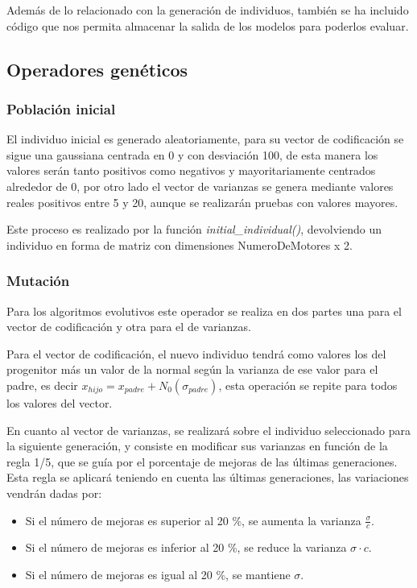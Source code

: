 \documentclass[12pt, spanish, pdftex]{UC3M_document}
\begin{document}
Además de lo relacionado con la generación de individuos, también se ha incluido código que nos permita almacenar la salida de los modelos para poderlos evaluar.

\subsection{Operadores genéticos}
\subsubsection{Población inicial}
El individuo inicial es generado aleatoriamente, para su vector de codificación se sigue una gaussiana centrada en 0 y con desviación 100, de esta manera los valores serán tanto positivos como negativos y mayoritariamente centrados alrededor de 0, por otro lado el vector de varianzas se genera mediante valores reales positivos entre 5 y 20, aunque se realizarán pruebas con valores mayores.

Este proceso es realizado por la función \textit{initial\_individual()}, devolviendo un individuo en forma de matriz con dimensiones NumeroDeMotores x 2.  

\subsubsection{Mutación}
Para los algoritmos evolutivos este operador se realiza en dos partes una para el vector de codificación y otra para el de varianzas.

Para el vector de codificación, el nuevo individuo tendrá como valores los del progenitor más un valor de la normal según la varianza de ese valor para el padre, es decir $x_{hijo}=x_{padre}+N_0(\sigma_{padre})$, esta operación se repite para todos los valores del vector.

En cuanto al vector de varianzas, se realizará sobre el individuo seleccionado para la siguiente generación, y consiste en modificar sus varianzas en función de la regla 1/5, que se guía por el porcentaje de mejoras de las últimas generaciones. Esta regla se aplicará teniendo en cuenta las últimas generaciones, las variaciones vendrán dadas por:
\begin{itemize}
	\item Si el número de mejoras es superior al 20 \%, se aumenta la varianza $\frac \sigma c$.
	\item Si el número de mejoras es inferior al 20 \%, se reduce la varianza $\sigma \cdot c$.
	\item Si el número de mejoras es igual al 20 \%, se mantiene $\sigma$.
\end{itemize}
\end{document}
